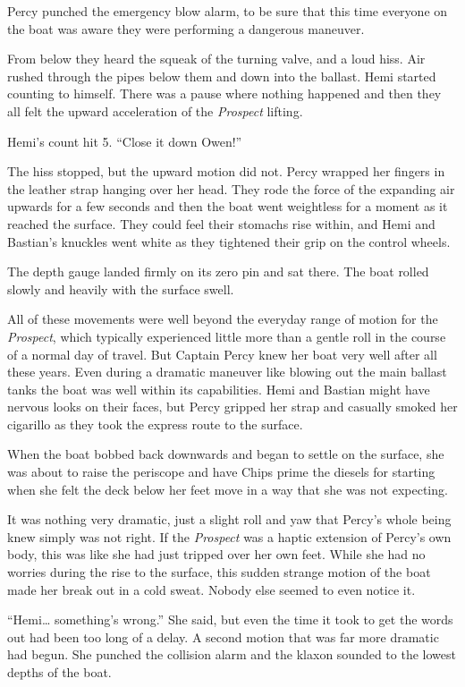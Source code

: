 \documentclass[]{scrbook}
\begin{document}
Percy punched the emergency blow alarm, to be sure that this time
everyone on the boat was aware they were performing a dangerous
maneuver.

From below they heard the squeak of the turning valve, and a loud hiss.
Air rushed through the pipes below them and down into the ballast. Hemi
started counting to himself. There was a pause where nothing happened
and then they all felt the upward acceleration of the \emph{Prospect}
lifting.

Hemi's count hit 5. ``Close it down Owen!''

The hiss stopped, but the upward motion did not. Percy wrapped her
fingers in the leather strap hanging over her head. They rode the force
of the expanding air upwards for a few seconds and then the boat went
weightless for a moment as it reached the surface. They could feel their
stomachs rise within, and Hemi and Bastian's knuckles went white as they
tightened their grip on the control wheels.

The depth gauge landed firmly on its zero pin and sat there. The boat
rolled slowly and heavily with the surface swell.

All of these movements were well beyond the everyday range of motion for
the \emph{Prospect}, which typically experienced little more than a
gentle roll in the course of a normal day of travel. But Captain Percy
knew her boat very well after all these years. Even during a dramatic
maneuver like blowing out the main ballast tanks the boat was well
within its capabilities. Hemi and Bastian might have nervous looks on
their faces, but Percy gripped her strap and casually smoked her
cigarillo as they took the express route to the surface.

When the boat bobbed back downwards and began to settle on the surface,
she was about to raise the periscope and have Chips prime the diesels
for starting when she felt the deck below her feet move in a way that
she was not expecting.

It was nothing very dramatic, just a slight roll and yaw that Percy's
whole being knew simply was not right. If the \emph{Prospect} was a
haptic extension of Percy's own body, this was like she had just tripped
over her own feet. While she had no worries during the rise to the
surface, this sudden strange motion of the boat made her break out in a
cold sweat. Nobody else seemed to even notice it.

``Hemi\ldots{} something's wrong.'' She said, but even the time it took
to get the words out had been too long of a delay. A second motion that
was far more dramatic had begun. She punched the collision alarm and the
klaxon sounded to the lowest depths of the boat.
\end{document}
